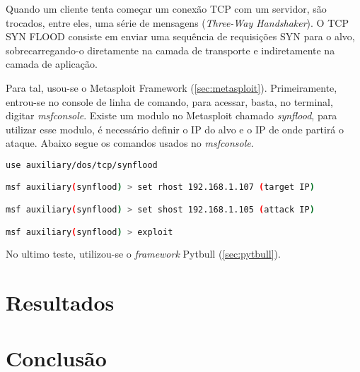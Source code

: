 Quando um cliente tenta começar um conexão TCP com um servidor, são trocados, entre eles, uma série de mensagens (\textit{Three-Way Handshaker}). O TCP SYN FLOOD consiste em enviar uma sequência de requisições SYN para o alvo, sobrecarregando-o diretamente na camada de transporte e indiretamente na camada de aplicação.

Para tal, usou-se o Metasploit Framework (\autoref{sec:metasploit}). Primeiramente, entrou-se no console de linha de comando, para acessar, basta, no terminal, digitar \textit{msfconsole}. Existe um modulo no Metasploit chamado \textit{synflood}, para utilizar esse modulo, é necessário definir o IP do alvo e o IP de onde partirá o ataque. Abaixo segue os comandos usados no \textit{msfconsole}.

\begin{lstlisting}[language=bash, frame=single]
use auxiliary/dos/tcp/synflood

msf auxiliary(synflood) > set rhost 192.168.1.107 (target IP)

msf auxiliary(synflood) > set shost 192.168.1.105 (attack IP)

msf auxiliary(synflood) > exploit
\end{lstlisting}

No ultimo teste, utilizou-se o \textit{framework} Pytbull (\autoref{sec:pytbull}). 

\section{Resultados} \label{sec:resultados}
\section{Conclusão} \label{sec:conclusão}
